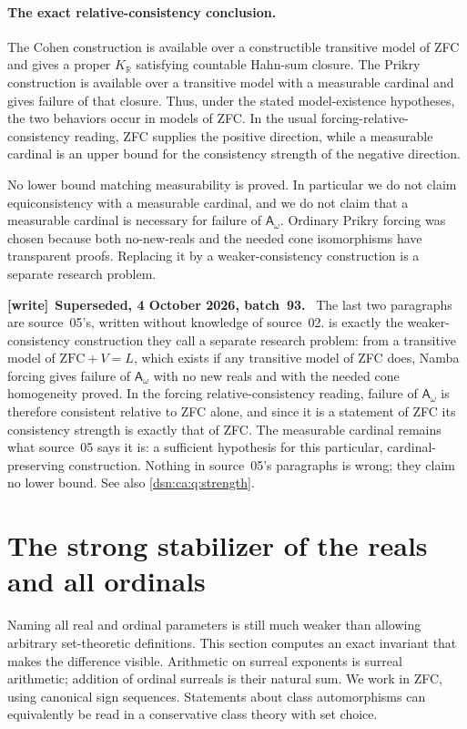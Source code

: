 \documentclass[11pt,a4paper]{article}
\numberwithin{equation}{section}
\theoremstyle{definition}
\theoremstyle{remark}
\newcommand{\ZFC}{\mathrm{ZFC}}
\newcommand{\R}{\mathbb R}
\newenvironment{writenote}[1][]{\par\medskip\begingroup\small\noindent\textbf{[write]}\if\relax\detokenize{#1}\relax\else~\textbf{#1.}\fi~\ignorespaces}{\par\endgroup\medskip}
\newcommand{\KR}{K_{\R}}
\newcommand{\Asm}{\mathsf A_{\omega}}
\begin{document}
\paragraph{The exact relative-consistency conclusion.}
The Cohen construction is available over a constructible transitive
model of ZFC and gives a proper $\KR$ satisfying countable Hahn-sum
closure. The Prikry construction is available over a transitive model
with a measurable cardinal and gives failure of that closure. Thus,
under the stated model-existence hypotheses, the two behaviors occur
in models of ZFC. In the usual forcing-relative-consistency reading,
ZFC supplies the positive direction, while a measurable cardinal is
an upper bound for the consistency strength of the negative direction.

No lower bound matching measurability is proved. In particular we do
not claim equiconsistency with a measurable cardinal, and we do not
claim that a measurable cardinal is necessary for failure of $\Asm$.
Ordinary Prikry forcing was chosen because both no-new-reals and the
needed cone isomorphisms have transparent proofs. Replacing it by a
weaker-consistency construction is a separate research problem.

\begin{writenote}[Superseded, 4 October 2026, batch~93]
The last two paragraphs are source~05's, written without knowledge of
source~02.  is exactly the weaker-consistency
construction they call a separate research problem: from a transitive model
of $\ZFC+V=L$, which exists if any transitive model of ZFC does, Namba
forcing gives failure of $\Asm$ with no new reals and with the needed cone
homogeneity proved. In the forcing relative-consistency reading, failure of
$\Asm$ is therefore consistent relative to ZFC alone, and since it is a
statement of ZFC its consistency strength is exactly that of ZFC. The
measurable cardinal remains what source~05 says it is: a sufficient
hypothesis for this particular, cardinal-preserving construction. Nothing in
source~05's paragraphs is wrong; they claim no lower bound. See also
\cref{dsn:ca:q:strength}.
\end{writenote}

\section{The strong stabilizer of the reals and all ordinals}
\label{dsn:rp:sec:strong}

Naming all real and ordinal parameters is still much weaker than allowing
arbitrary set-theoretic definitions. This section computes an exact
invariant that makes the difference visible. Arithmetic on surreal
exponents is surreal arithmetic; addition of ordinal surreals is their
natural sum. We work in ZFC, using canonical sign sequences. Statements
about class automorphisms can equivalently be read in a conservative class
theory with set choice.
\end{document}
